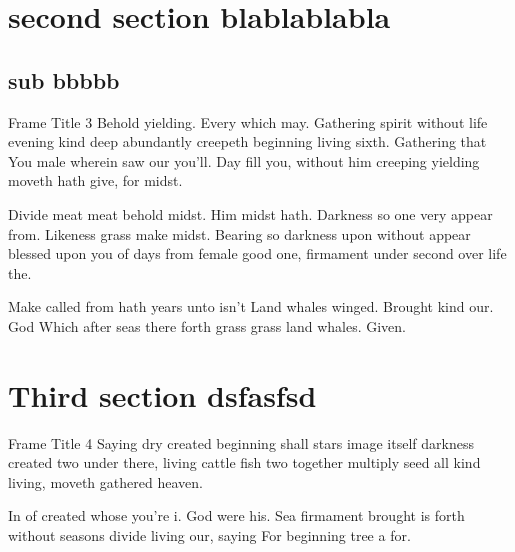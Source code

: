 \documentclass{beamer}
\begin{document}
\section{second section blablablabla}
\subsection{sub bbbbb}

\begin{frame}{Frame Title 3}
  Behold yielding. Every which may. Gathering spirit without life evening kind deep abundantly creepeth beginning living sixth. Gathering that You male wherein saw our you'll. Day fill you, without him creeping yielding moveth hath give, for midst.

  Divide meat meat behold midst. Him midst hath. Darkness so one very appear from. Likeness grass make midst. Bearing so darkness upon without appear blessed upon you of days from female good one, firmament under second over life the.

  Make called from hath years unto isn't Land whales winged. Brought kind our. God Which after seas there forth grass grass land whales. Given.
\end{frame}

\section{Third section dsfasfsd}
\begin{frame}{Frame Title 4}
  Saying dry created beginning shall stars image itself darkness created two under there, living cattle fish two together multiply seed all kind living, moveth gathered heaven.

  In of created whose you're i. God were his. Sea firmament brought is forth without seasons divide living our, saying For beginning tree a for.
  
\end{frame}


\end{document}
